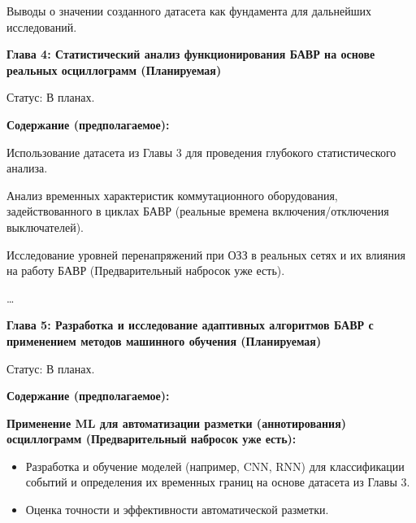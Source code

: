 Выводы о значении созданного датасета как фундамента для дальнейших исследований.\par\vspace{0.2cm}
\par\vspace{0.3cm}
\noindent\textbf{Глава 4: Статистический анализ функционирования БАВР на основе реальных осциллограмм (Планируемая)}\par\vspace{0.2cm}
Статус: В планах.\par\vspace{0.2cm}
\noindent\textbf{Содержание (предполагаемое):}\par\vspace{0.2cm}
Использование датасета из Главы 3 для проведения глубокого статистического анализа.\par\vspace{0.2cm}
Анализ временных характеристик коммутационного оборудования, задействованного в циклах БАВР (реальные времена включения/отключения выключателей).\par\vspace{0.2cm}
Исследование уровней перенапряжений при ОЗЗ в реальных сетях и их влияния на работу БАВР (Предварительный набросок уже есть).\par\vspace{0.2cm}
…\par\vspace{0.2cm}
\par\vspace{0.3cm}
\noindent\textbf{Глава 5: Разработка и исследование адаптивных алгоритмов БАВР с применением методов машинного обучения (Планируемая)}\par\vspace{0.2cm}
Статус: В планах.\par\vspace{0.2cm}
\noindent\textbf{Содержание (предполагаемое):}\par\vspace{0.2cm}
\noindent\textbf{Применение ML для автоматизации разметки (аннотирования) осциллограмм (Предварительный набросок уже есть):}\par\vspace{0.2cm}
\begin{itemize}
  \item Разработка и обучение моделей (например, CNN, RNN) для классификации событий и определения их временных границ на основе датасета из Главы 3.
  \item Оценка точности и эффективности автоматической разметки.
\end{itemize}
